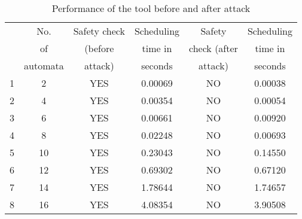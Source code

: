 \begin{table}[ht]
\caption{Performance of the tool before and after attack}
\centering
\begin{tabular}{|c | c | c | c | c | c|}
\hline %
 & No.           &  Safety check       & Scheduling   & Safety       &Scheduling  \\       
     & of            &  (before   & time in      & check (after   &time in            \\  
     & automata      &  attack)        & seconds     & attack)      &seconds    \\
\hline
\hline
1 & 2 & YES & 0.00069 & NO & 0.00038\\

2 & 4  & YES & 0.00354 & NO &  0.00054 \\

3 & 6  & YES & 0.00661 & NO & 0.00920 \\

4 & 8 & YES &  0.02248 & NO & 0.00693 \\

5 & 10 & YES & 0.23043 & NO & 0.14550 \\

6 & 12 & YES & 0.69302 & NO & 0.67120 \\

7 & 14 & YES & 1.78644 & NO & 1.74657 \\

8 & 16 & YES & 4.08354 & NO & 3.90508 \\

\hline

\end{tabular}
\label{table:nonlin}

\end{table}

